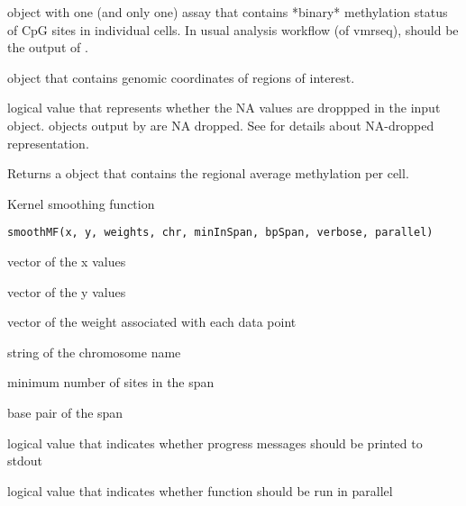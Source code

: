 \documentclass[letterpaper]{book}
\begin{document}
%
\begin{Arguments}
\begin{ldescription}
\item[\code{SE}]  object with one (and only one) assay that
contains *binary* methylation status of CpG sites in individual cells. In usual
analysis workflow (of vmrseq),  should be the output of .

\item[\code{region\_ranges}]  object that contains genomic coordinates
of regions of interest.

\item[\code{sparseNAdrop}] logical value that represents whether the NA values are
droppped in the input  object.  objects output by
 are NA dropped. See 
for details about NA-dropped representation.
\end{ldescription}
\end{Arguments}
%
\begin{Value}
Returns a  object that contains the regional
average methylation per cell.
\end{Value}
%
\begin{Description}
Kernel smoothing function
\end{Description}
%
\begin{Usage}
\begin{verbatim}
smoothMF(x, y, weights, chr, minInSpan, bpSpan, verbose, parallel)
\end{verbatim}
\end{Usage}
%
\begin{Arguments}
\begin{ldescription}
\item[\code{x}] vector of the x values

\item[\code{y}] vector of the y values

\item[\code{weights}] vector of the weight associated with each data point

\item[\code{chr}] string of the chromosome name

\item[\code{minInSpan}] minimum number of sites in the span

\item[\code{bpSpan}] base pair of the span

\item[\code{verbose}] logical value that indicates whether progress messages
should be printed to stdout

\item[\code{parallel}] logical value that indicates whether function should be
run in parallel
\end{ldescription}
\end{Arguments}
\end{document}
